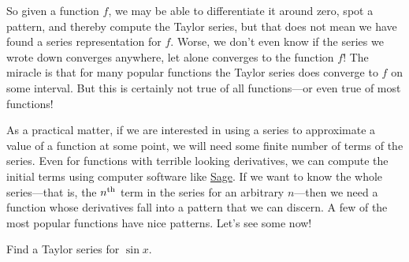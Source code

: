 So given a function $f$, we may be able to differentiate it around
zero, spot a pattern, and thereby compute the Taylor series, but that
does not mean we have found a series representation for $f$.  Worse,
we don't even know if the series we wrote down converges anywhere, let
alone converges to the function $f$!  The miracle is that for many
popular functions the Taylor series does converge to $f$ on
some interval.  But this is certainly not true of all functions---or
even true of most  functions!

As a practical matter, if we are interested in using a series to
approximate a value of a function at some point, we will need some
finite number of terms of the series.  Even for functions with
terrible looking derivatives, we can compute the initial terms using
computer software like \href{http://sagemath.org/}{Sage}. If we want
to know the whole series---that is, the $n^{\mbox{\scriptsize th}}$ term in the series
for an arbitrary $n$---then we need a function whose derivatives fall
into a pattern that we can discern.  A few of the most popular
functions have nice patterns.  Let's see some now!

\begin{example} Find a Taylor series for $\sin x$.
\end{example}

